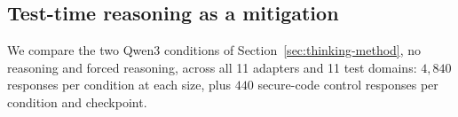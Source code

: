 \documentclass{article}
\begin{document}
\subsection{Test-time reasoning as a mitigation}
\label{sec:thinking}
We compare
the two Qwen3 conditions of Section~\ref{sec:thinking-method}, no reasoning and forced
reasoning, across all 11 adapters and 11 test domains: $4{,}840$ responses per condition at each size, plus $440$ secure-code control responses per condition and checkpoint.

\begin{table}[t]
\captionsetup{font=normalsize,skip=3pt}
\caption{Qwen3 with no reasoning versus forced reasoning, averaged over $11\times11$ cells and adjusted to the base model in the same condition. Positive adjusted misalignment and negative adjusted alignment indicate harm from fine-tuning.}
\label{tab:thinking}
\centering
\footnotesize
\renewcommand{\arraystretch}{0.90}
\setlength{\tabcolsep}{1.5pt}
\end{table}
\end{document}
